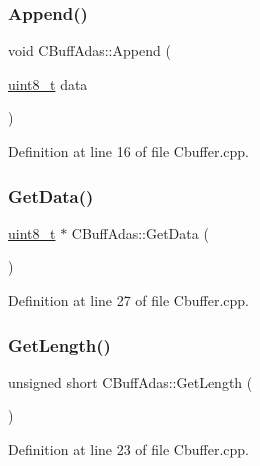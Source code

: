 \subsubsection{\texorpdfstring{Append()}{Append()}}
{\footnotesize\ttfamily void C\+Buff\+Adas\+::\+Append (\begin{DoxyParamCaption}\item[{\mbox{\hyperlink{_a_d_a_s___types_8h_aba7bc1797add20fe3efdf37ced1182c5}{uint8\+\_\+t}}}]{data }\end{DoxyParamCaption})}



Definition at line 16 of file Cbuffer.\+cpp.

\mbox{\label{class_c_buff_adas_a56fdcdc9766874d3a6fef04119ee91f9}} 
\subsubsection{\texorpdfstring{Get\+Data()}{GetData()}}
{\footnotesize\ttfamily \mbox{\hyperlink{_a_d_a_s___types_8h_aba7bc1797add20fe3efdf37ced1182c5}{uint8\+\_\+t}} $\ast$ C\+Buff\+Adas\+::\+Get\+Data (\begin{DoxyParamCaption}{ }\end{DoxyParamCaption})}



Definition at line 27 of file Cbuffer.\+cpp.

\mbox{\label{class_c_buff_adas_aa17f6536175e0aafe8ab7b307decf279}} 
\subsubsection{\texorpdfstring{Get\+Length()}{GetLength()}}
{\footnotesize\ttfamily unsigned short C\+Buff\+Adas\+::\+Get\+Length (\begin{DoxyParamCaption}{ }\end{DoxyParamCaption})}



Definition at line 23 of file Cbuffer.\+cpp.

\mbox{\label{class_c_buff_adas_aedceb4a4bcc47b6e4150a821f0494862}} 
